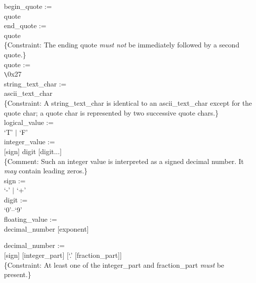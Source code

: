 \documentclass[11pt,makeidx]{book}     %
\begin{document}
begin\_quote :=   \\ \null \hspace{0.5in}
	quote \\

end\_quote :=   \\ \null \hspace{0.5in}
	quote \\
\{Constraint: The ending quote {\em must not} be immediately followed by a
second quote.\} \\

quote :=   \\ \null \hspace{0.5in}
	\verb+\+0x27 \\

string\_text\_char :=   \\ \null \hspace{0.5in}
	ascii\_text\_char \\
\{Constraint: A string\_text\_char is identical to an ascii\_text\_char
except for the quote char; a quote char is represented by two successive
quote chars.\} \\

logical\_value :=   \\ \null \hspace{0.5in}
	`T' $|$ `F' \\

integer\_value :=   \\ \null \hspace{0.5in}
	[sign] digit [digit...] \\
\{Comment: Such an integer value is interpreted as a signed decimal
number.  It {\em may} contain leading zeros.\} \\

sign :=   \\ \null \hspace{0.5in}
	`-' $|$ `+' \\

digit :=   \\ \null \hspace{0.5in}
	`0'--`9' \\

floating\_value :=   \\ \null \hspace{0.5in}
	decimal\_number [exponent]

decimal\_number :=   \\ \null \hspace{0.5in}
	[sign] [integer\_part] [`.' [fraction\_part]]  \\
\{Constraint: At least one of the integer\_part and fraction\_part {\em must} be
present.\} \\
\end{document}
